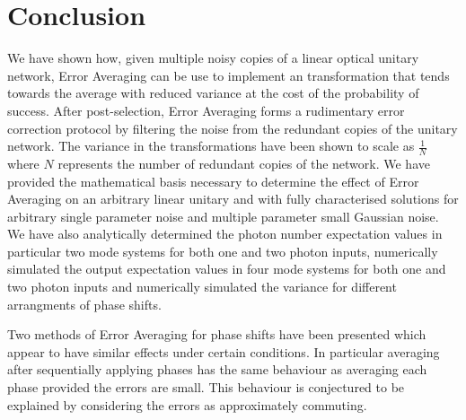 \documentclass[aps,pra,twocolumn,superscriptaddress,numerical,floatfix]{revtex4-1}
\begin{document}
\section{Conclusion\label{Conclusion}}

We have shown how, given multiple noisy copies of a linear optical unitary network, Error Averaging can be use to implement an transformation that tends towards the average with reduced variance at the cost of the probability of success.  After post-selection, Error Averaging forms a rudimentary error correction protocol by filtering the noise from the redundant copies of the unitary network. The variance in the transformations have been shown to scale as $\frac{1}{N}$ where $N$ represents the number of redundant copies of the network.  We have provided the mathematical basis necessary to determine the effect of Error Averaging on an arbitrary linear unitary and with fully characterised solutions for arbitrary single parameter noise and multiple parameter small Gaussian noise. We have also analytically determined the photon number expectation values in particular two mode systems for both one and two photon inputs, numerically simulated the output expectation values in four mode systems for both one and two photon inputs and numerically simulated the variance for different arrangments of phase shifts.

Two methods of Error Averaging for phase shifts have been presented which appear to have similar effects under certain conditions. In particular averaging after sequentially applying phases has the same behaviour as averaging each phase provided the errors are small. This behaviour is conjectured to be explained by considering the errors as approximately commuting.


\end{document}
